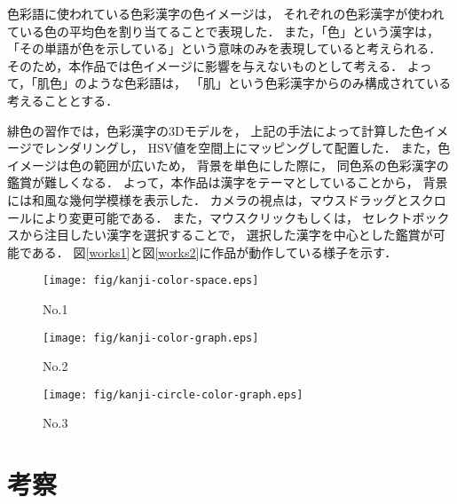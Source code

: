 \documentclass[a4j,twocolumn]{ujarticle} %
\newcommand{\workname}{緋色の習作}
\newcommand{\colorname}{色彩語}
\newcommand{\colorkanji}{色彩漢字}
\newcommand{\recallcolor}{色イメージ}
\begin{document}
\colorname{}に使われている\colorkanji{}の\recallcolor{}は，
それぞれの\colorkanji{}が使われている色の平均色を割り当てることで表現した．
また，「色」という漢字は，
「その単語が色を示している」という意味のみを表現していると考えられる．
そのため，本作品では\recallcolor{}に影響を与えないものとして考える．
よって，「肌色」のような\colorname{}は，
「肌」という\colorkanji{}からのみ構成されている考えることとする．

\workname{}では，\colorkanji{}の3Dモデルを，
上記の手法によって計算した\recallcolor{}でレンダリングし，
HSV値を空間上にマッピングして配置した．
また，\recallcolor{}は色の範囲が広いため，
背景を単色にした際に，
同色系の\colorkanji{}の鑑賞が難しくなる．
よって，本作品は漢字をテーマとしていることから，
背景には和風な幾何学模様を表示した．
カメラの視点は，マウスドラッグとスクロールにより変更可能である．
また，マウスクリックもしくは，
セレクトボックスから注目したい漢字を選択することで，
選択した漢字を中心とした鑑賞が可能である．
図\ref{works1}と図\ref{works2}に作品が動作している様子を示す．




\begin{figure}[htbp]
  \texttt{[image: fig/kanji-color-space.eps]}
  \caption{No.1}
  \label{no1}
\end{figure}

\begin{figure}[htbp]
  \texttt{[image: fig/kanji-color-graph.eps]}
  \caption{No.2}
  \label{no2}
\end{figure}

\begin{figure}[htbp]
  \texttt{[image: fig/kanji-circle-color-graph.eps]}
  \caption{No.3}
  \label{no3}
\end{figure}

\section{考察}
\end{document}
